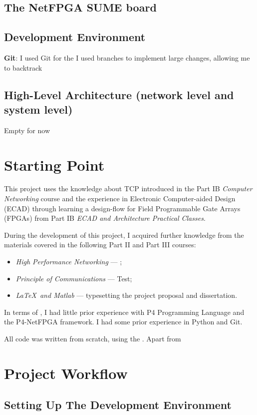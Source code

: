 	\subsection{The NetFPGA SUME board}
	
	\subsection{Development Environment}
	\textbf{Git}: I used Git for the I used branches to implement large changes, allowing me to backtrack
	
	\subsection{High-Level Architecture (network level and system level)}
	Empty for now
	
\section{Starting Point}
This project uses the knowledge about TCP introduced in the Part IB \textit{Computer Networking} course and the experience in Electronic Computer-aided Design (ECAD) through learning a design-flow for Field Programmable Gate Arrays (FPGAs) from Part IB \textit{ECAD and Architecture Practical Classes}.

During the development of this project, I acquired further knowledge from the materials covered in the following Part II and Part III courses:%

\begin{itemize}[itemsep=4pt]
	\item \textit{High Performance Networking} --- ;%
	\item \textit{Principle of Communications} --- Test;%
	\item \textit{\LaTeX \ and Matlab} --- typesetting the project proposal and dissertation.%
\end{itemize}

In terms of , I had little prior experience with P4 Programming Language and the P4-NetFPGA framework. I had some prior experience in Python and Git.

All code was written from scratch, using the . Apart from 

\section{Project Workflow}
\subsection{Setting Up The Development Environment}
